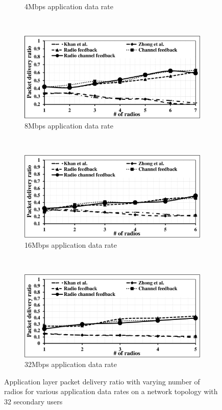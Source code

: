 \begin{landscape}
\begin{figure}[!htbp]
\begin{subfigure}[t]{0.625\textwidth}
        \caption{4Mbps application data rate}
    \end{subfigure}
    ~
    \begin{subfigure}[t]{0.625\textwidth}
        \includegraphics[width=\textwidth]{alltopology/32DeliveryRatio24d8}
        \caption{8Mbps application data rate}
    \end{subfigure}
    ~\\
    \begin{subfigure}[t]{0.625\textwidth}
        \includegraphics[width=\textwidth]{alltopology/32DeliveryRatio24d16}
        \caption{16Mbps application data rate}
    \end{subfigure}
    ~
    \begin{subfigure}[t]{0.625\textwidth}
        \includegraphics[width=\textwidth]{alltopology/32DeliveryRatio24d32}
        \caption{32Mbps application data rate}
    \end{subfigure}
    \caption{Application layer packet delivery ratio with varying number of radios for various application data rates on a network topology with 32 secondary users}
\end{figure}
\end{landscape}
